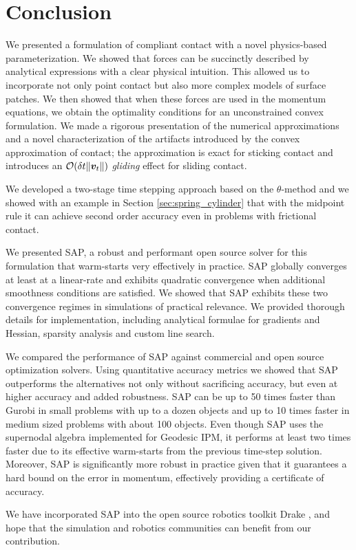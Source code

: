 \section{Conclusion}
\label{sec:future_directions}

We presented a formulation of compliant contact with a novel physics-based
parameterization. We showed that forces can be succinctly described by
analytical expressions with a clear physical intuition. This allowed us to
incorporate not only point contact but also more complex models of surface
patches. We then showed that when these forces are used in the momentum
equations, we obtain the optimality conditions for an unconstrained convex
formulation. We made a rigorous presentation of the numerical approximations and
a novel characterization of the artifacts introduced by the convex approximation
of contact; the approximation is exact for sticking contact and introduces an
$\mathcal{O}(\delta t\|{\bm{v}}_t\|)$ \emph{gliding} effect for sliding contact.

We developed a two-stage time stepping approach based on the
$\theta\text{-method}$ and we showed with an example in Section
\ref{sec:spring_cylinder} that with the midpoint rule it can achieve second
order accuracy even in problems with frictional contact. 

We presented SAP, a robust and performant open source solver for this
formulation that warm-starts very effectively in practice. SAP globally
converges at least at a linear-rate and exhibits quadratic convergence when
additional smoothness conditions are satisfied. We showed that SAP exhibits
these two convergence regimes in simulations of practical relevance. We provided
thorough details for implementation, including analytical formulae for gradients
and Hessian, sparsity analysis and custom line search.

We compared the performance of SAP against commercial and open source
optimization solvers. Using quantitative accuracy metrics we showed that SAP
outperforms the alternatives not only without sacrificing accuracy, but even at
higher accuracy and added robustness. SAP can be up to 50 times faster than
Gurobi in small problems with up to a dozen objects and up to 10 times faster in
medium sized problems with about 100 objects. Even though SAP uses the
supernodal algebra implemented for Geodesic IPM, it performs at least two times
faster due to its effective warm-starts from the previous time-step solution.
Moreover, SAP is significantly more robust in practice given that it guarantees
a hard bound on the error in momentum, effectively providing a certificate of
accuracy.

We have incorporated SAP into the open source robotics toolkit Drake
\cite{bib:drake}, and hope that the simulation and robotics communities can
benefit from our contribution.
